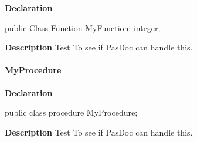 \documentclass{report}
\begin{document}
\begin{list}{}{
\setlength{\itemindent}{0cm}
\setlength{\listparindent}{0cm}
\setlength{\leftmargin}{\evensidemargin}
\addtolength{\leftmargin}{\tmplength}
\settowidth{\labelsep}{X}
\addtolength{\leftmargin}{\labelsep}
\setlength{\labelwidth}{\tmplength}
}
\begin{flushleft}
\item[\textbf{Declaration}\hfill]
\begin{ttfamily}
public Class Function MyFunction: integer;\end{ttfamily}


\end{flushleft}
\par
\item[\textbf{Description}]
Test To see if PasDoc can handle this.

\end{list}
\paragraph*{MyProcedure}\hspace*{\fill}

\begin{list}{}{
\setlength{\itemindent}{0cm}
\setlength{\listparindent}{0cm}
\setlength{\leftmargin}{\evensidemargin}
\addtolength{\leftmargin}{\tmplength}
\settowidth{\labelsep}{X}
\addtolength{\leftmargin}{\labelsep}
\setlength{\labelwidth}{\tmplength}
}
\begin{flushleft}
\item[\textbf{Declaration}\hfill]
\begin{ttfamily}
public class procedure MyProcedure;\end{ttfamily}


\end{flushleft}
\par
\item[\textbf{Description}]
Test To see if PasDoc can handle this.

\end{list}
\end{document}
